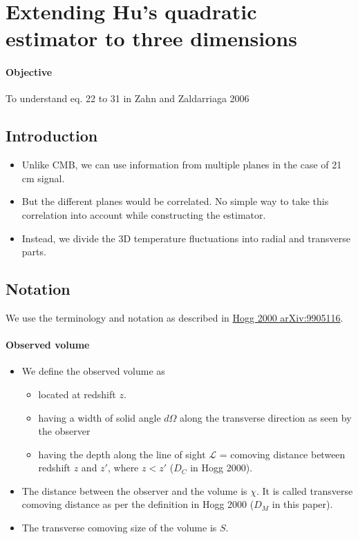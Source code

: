 \documentclass[12pt]{article}
\numberwithin{equation}{section}
\begin{document}
\tableofcontents
\pagebreak

\section{Extending Hu's quadratic estimator to three dimensions}
\paragraph{Objective} To understand eq. 22 to 31 in Zahn and Zaldarriaga 2006

\subsection{Introduction}
\begin{itemize}
	\item Unlike CMB, we can use information from multiple planes in the case of 21 cm signal.
	\item But the different planes would be correlated. No simple way to take this correlation into account while constructing the estimator.
	\item Instead, we divide the 3D temperature fluctuations into radial and transverse parts.
\end{itemize}

\subsection{Notation}
We use the terminology and notation as described in \href{http://arxiv.org/abs/astro-ph/9905116v4}{Hogg 2000 arXiv:9905116}.
\paragraph{Observed volume}
\begin{itemize}
	\item We define the observed volume as
		\begin{itemize}
			\item located at redshift $ z $. 
			\item having a width of solid angle $ d\Omega $ along the transverse direction as seen by the observer
			\item having the depth along the line of sight $ \mathcal{L} $ = comoving distance between redshift $ z$ and $ z' $, where $ z < z' $ ($ D_C $ in Hogg 2000).
		\end{itemize}
	\item The  distance between the observer and the volume is $ \chi $. It is called transverse comoving distance as per the definition in Hogg 2000 ($ D_M$ in this paper).
	\item The transverse comoving size of the volume is $ S $. 
\end{itemize}
\end{document}
